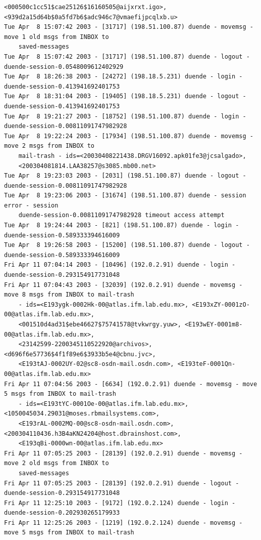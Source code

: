 \begin{lstlisting}[style=terminal]
    <000500c1cc51$cae25126$16160505@aijxrxt.igo>, <939d2a15d64b$0a5fd7b6$adc946c7@vmaefijpcqlxb.u>
Tue Apr  8 15:07:42 2003 - [31717] (198.51.100.87) duende - movemsg - move 1 old msgs from INBOX to 
    saved-messages
Tue Apr  8 15:07:42 2003 - [31717] (198.51.100.87) duende - logout - duende-session-0.0548009612402929
Tue Apr  8 18:26:38 2003 - [24272] (198.18.5.231) duende - login - duende-session-0.413941692401753
Tue Apr  8 18:31:04 2003 - [19405] (198.18.5.231) duende - logout - duende-session-0.413941692401753
Tue Apr  8 19:21:27 2003 - [18752] (198.51.100.87) duende - login - duende-session-0.00811091747982928
Tue Apr  8 19:22:24 2003 - [17934] (198.51.100.87) duende - movemsg - move 2 msgs from INBOX to 
    mail-trash - ids=<20030408221438.DRGV16092.apk01fe3@jcsalgado>, 
    <200304081814.LAA38257@s3085.mb00.net>
Tue Apr  8 19:23:03 2003 - [2031] (198.51.100.87) duende - logout - duende-session-0.00811091747982928
Tue Apr  8 19:23:06 2003 - [31674] (198.51.100.87) duende - session error - session 
    duende-session-0.00811091747982928 timeout access attempt
Tue Apr  8 19:24:44 2003 - [821] (198.51.100.87) duende - login - duende-session-0.589333394616009
Tue Apr  8 19:26:58 2003 - [15200] (198.51.100.87) duende - logout - duende-session-0.589333394616009
Fri Apr 11 07:04:14 2003 - [10496] (192.0.2.91) duende - login - duende-session-0.293154917731048
Fri Apr 11 07:04:43 2003 - [32039] (192.0.2.91) duende - movemsg - move 8 msgs from INBOX to mail-trash 
    - ids=<E193ygk-0002Hk-00@atlas.ifm.lab.edu.mx>, <E193xZY-0001zO-00@atlas.ifm.lab.edu.mx>, 
    <001510d4ad31$ebe46627$75741578@tvkwrgy.yuw>, <E193wEY-0001m8-00@atlas.ifm.lab.edu.mx>, 
    <23142599-2200345110522920@archivos>, <d696f6e57736$4f1f89e6$3933b5e4@cbnu.jvc>, 
    <E193tAJ-0002UY-02@sc8-osdn-mail.osdn.com>, <E193teF-0001Qn-00@atlas.ifm.lab.edu.mx>
Fri Apr 11 07:04:56 2003 - [6634] (192.0.2.91) duende - movemsg - move 5 msgs from INBOX to mail-trash 
    - ids=<E193tYC-0001Oe-00@atlas.ifm.lab.edu.mx>, <1050045034.29031@moses.rbmailsystems.com>, 
    <E193rAL-0002MQ-00@sc8-osdn-mail.osdn.com>, <200304110436.h3B4aKN24204@host.dbrainshost.com>, 
    <E193qBi-0000wn-00@atlas.ifm.lab.edu.mx>
Fri Apr 11 07:05:25 2003 - [28139] (192.0.2.91) duende - movemsg - move 2 old msgs from INBOX to 
    saved-messages
Fri Apr 11 07:05:25 2003 - [28139] (192.0.2.91) duende - logout - duende-session-0.293154917731048
Fri Apr 11 12:25:10 2003 - [9172] (192.0.2.124) duende - login - duende-session-0.202930265179933
Fri Apr 11 12:25:26 2003 - [1219] (192.0.2.124) duende - movemsg - move 5 msgs from INBOX to mail-trash 

\end{lstlisting}
